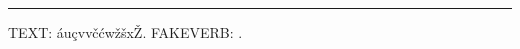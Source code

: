 \documentclass{article}
\begin{document}
\START
\hrule\bigskip

TEXT: áuçvvčćwžšxŽ. FAKEVERB: .
\ENDTEST
\end{document}
